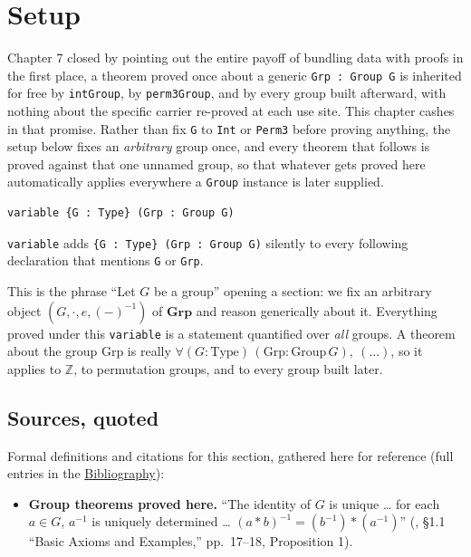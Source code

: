 \section{Setup}\label{sec:08-group-theorems:01-setup:1}

Chapter 7 closed by pointing out the entire payoff of bundling data with proofs in the first place, a theorem proved once about a generic \texttt{Grp : Group G} is inherited for free by \texttt{intGroup}, by \texttt{perm3Group}, and by every group built afterward, with nothing about the specific carrier re-proved at each use site. This chapter cashes in that promise. Rather than fix \texttt{G} to \texttt{Int} or \texttt{Perm3} before proving anything, the setup below fixes an \emph{arbitrary} group once, and every theorem that follows is proved against that one unnamed group, so that whatever gets proved here automatically applies everywhere a \texttt{Group} instance is later supplied.

\begin{lstlisting}
variable {G : Type} (Grp : Group G)
\end{lstlisting}

\texttt{variable} adds \texttt{\{G : Type\} (Grp : Group G)} silently to every following declaration that mentions \texttt{G} or \texttt{Grp}.

\begin{mathreading}

This is the phrase ``Let \(G\) be a group'' opening a section: we fix an arbitrary object \((G, \cdot, e, (-)^{-1})\) of \(\mathbf{Grp}\) and reason generically about it. Everything proved under this \texttt{variable} is a statement quantified over \emph{all} groups. A theorem about the group \(\mathrm{Grp}\) is really \(\forall (G : \mathrm{Type})\,(\mathrm{Grp} :
\mathrm{Group}\,G),\ (\ldots)\), so it applies to \(\mathbb{Z}\), to permutation groups, and to every group built later.

\end{mathreading}

\subsection{Sources, quoted}\label{sec:08-group-theorems:01-setup:2}

Formal definitions and citations for this section, gathered here for reference (full entries in the \hyperref[sec:root:bibliography:1]{Bibliography}):

\begin{itemize}
\tightlist
\item
  \textbf{Group theorems proved here.} ``The identity of \(G\) is unique \ldots{} for each \(a \in G\), \(a^{-1}\) is uniquely determined \ldots{} \((a{*}b)^{-1} = (b^{-1}){*}(a^{-1})\)'' (\cite{DummitFoote2003}, §1.1 ``Basic Axioms and Examples,'' pp.~17--18, Proposition 1).
\end{itemize}
